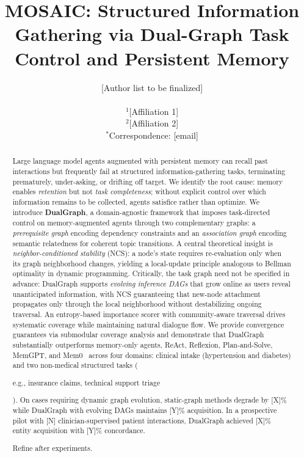 \documentclass[11pt,a4paper]{article}
\title{%
  MOSAIC: Structured Information Gathering via Dual-Graph Task Control and Persistent Memory
}
\author{
  [Author list to be finalized]\\
  \\
  \small $^1$[Affiliation 1]\\
  \small $^2$[Affiliation 2]\\
  \small $^*$Correspondence: [email]
}
\date{}
\newcommand{\placeholder}[1]{%
  \begin{tcolorbox}[colback=yellow!10,colframe=orange!60!black,
    fonttitle=\bfseries,title=Placeholder]
    #1
  \end{tcolorbox}%
}
\begin{document}
\maketitle

\begin{abstract}
Large language model agents augmented with persistent memory can recall
past interactions but frequently fail at structured information-gathering
tasks, terminating prematurely, under-asking, or drifting off target.
We identify the root cause: memory enables \emph{retention} but not
\emph{task completeness}; without explicit control over which information
remains to be collected, agents satisfice rather than optimize. We introduce
\textbf{DualGraph}, a domain-agnostic framework that imposes task-directed
control on memory-augmented agents through two complementary graphs:
a \emph{prerequisite graph} encoding dependency constraints and an
\emph{association graph} encoding semantic relatedness for coherent topic
transitions. A central theoretical insight is \emph{neighbor-conditioned
stability} (NCS): a node's state requires re-evaluation only when its graph
neighborhood changes, yielding a local-update principle analogous to
Bellman optimality in dynamic programming. Critically, the task graph need
not be specified in advance: DualGraph supports \emph{evolving inference
DAGs} that grow online as users reveal unanticipated information, with NCS
guaranteeing that new-node attachment propagates only through the local
neighborhood without destabilizing ongoing traversal. An entropy-based
importance scorer with community-aware traversal drives systematic coverage
while maintaining natural dialogue flow. We provide convergence guarantees
via submodular coverage analysis and demonstrate that DualGraph substantially
outperforms memory-only agents, ReAct, Reflexion, Plan-and-Solve,
MemGPT, and Mem0~\cite{mem0_2025} across four domains: clinical intake
(hypertension and diabetes) and two non-medical structured tasks
(\placeholder{e.g., insurance claims, technical support triage}).
On cases requiring dynamic graph evolution, static-graph methods degrade
by [X]\% while DualGraph with evolving DAGs maintains [Y]\% acquisition.
In a prospective pilot with [N] clinician-supervised patient interactions,
DualGraph achieved [X]\% entity acquisition with [Y]\% concordance.
\placeholder{Refine after experiments.}
\end{abstract}
\end{document}
